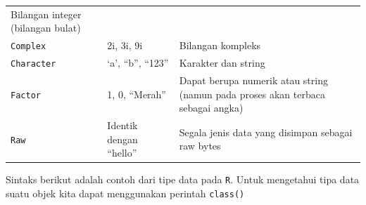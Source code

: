 \documentclass[12pt,]{krantz}
\begin{document}
\begin{longtable}[]{@{}lll@{}}
\begin{minipage}[t]{0.61\columnwidth}
Bilangan integer (bilangan bulat)\strut
\end{minipage}\tabularnewline
\begin{minipage}[t]{0.11\columnwidth}\raggedright
\texttt{Complex}\strut
\end{minipage} & \begin{minipage}[t]{0.19\columnwidth}\raggedright
2i, 3i, 9i\strut
\end{minipage} & \begin{minipage}[t]{0.61\columnwidth}\raggedright
Bilangan kompleks\strut
\end{minipage}\tabularnewline
\begin{minipage}[t]{0.11\columnwidth}\raggedright
\texttt{Character}\strut
\end{minipage} & \begin{minipage}[t]{0.19\columnwidth}\raggedright
`a', ``b'', ``123''\strut
\end{minipage} & \begin{minipage}[t]{0.61\columnwidth}\raggedright
Karakter dan string\strut
\end{minipage}\tabularnewline
\begin{minipage}[t]{0.11\columnwidth}\raggedright
\texttt{Factor}\strut
\end{minipage} & \begin{minipage}[t]{0.19\columnwidth}\raggedright
1, 0, ``Merah''\strut
\end{minipage} & \begin{minipage}[t]{0.61\columnwidth}\raggedright
Dapat berupa numerik atau string (namun pada proses akan terbaca sebagai angka)\strut
\end{minipage}\tabularnewline
\begin{minipage}[t]{0.11\columnwidth}\raggedright
\texttt{Raw}\strut
\end{minipage} & \begin{minipage}[t]{0.19\columnwidth}\raggedright
Identik dengan ``hello''\strut
\end{minipage} & \begin{minipage}[t]{0.61\columnwidth}\raggedright
Segala jenis data yang disimpan sebagai raw bytes\strut
\end{minipage}\tabularnewline
\bottomrule
\end{longtable}

Sintaks berikut adalah contoh dari tipe data pada \texttt{R}. Untuk mengetahui tipa data suatu objek kita dapat menggunakan perintah \texttt{class()}
\end{document}
